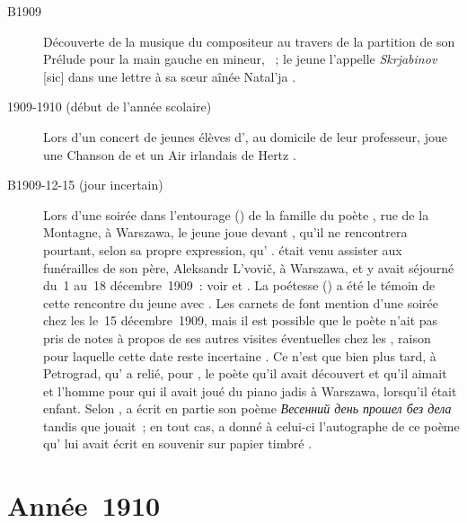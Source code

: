\begin{description}
 \item[B1909]
 Découverte de la musique du compositeur \AScriabine{} au travers de la
 partition de son Prélude pour la main gauche en \kC \Sharp mineur, 
 ~; le jeune \Sofronitsky{} l'appelle \emph{Skrjabinov} [sic] dans
 une lettre à sa sœur aînée Natal'ja \citep[voir][p.~55]{Juban}.
 \item[1909-1910 (début de l'année scolaire)]
 Lors d'un concert de jeunes élèves d'\ALebedevaGetsevich{}, au domicile de
 leur professeur, \VSofronitsky{} joue une Chanson de \Mendelssohn{} et un
 Air irlandais de Hertz \citep[voir][p.~136]{Nekrasova08}.
 \item[B1909-12-15 (jour incertain)]
 Lors d'une soirée dans l'entourage (\Gercog{}) de la famille du poète
 \ABlok{}, rue de la Montagne, à Warszawa, le jeune \Sofronitsky{} joue
 devant \Blok{}, qu'il ne rencontrera pourtant, selon sa propre expression,
 qu'
 \citep[voir][p.~392-393]{Voskobojnikov09a}.
 \Blok{} était venu assister aux funérailles de son père, Aleksandr L'vovič,
 à Warszawa, et y avait séjourné du~1 au~18 décembre~1909~: voir
 \citet[p.~432-433]{Milshteyn82a} et \citet[p.~136-139]{Nekrasova08}.
 La poétesse \EGercog{} () a été le témoin de cette
 rencontre du jeune \VSofronitsky{} avec \ABlok{}.
 Les carnets de \Blok{} font mention d'une soirée chez les \Gercog{} le~15
 décembre~1909, mais il est possible que le poète n'ait pas pris de notes à
 propos de ses autres visites éventuelles chez les \Gercog{}, raison pour
 laquelle cette date reste incertaine \citep[voir][p.~137]{Nekrasova08}.
 Ce n'est que bien plus tard, à Petrograd, qu'\EGercog{} a relié, pour
 \VSofronitsky{}, le poète qu'il avait découvert et qu'il aimait et l'homme
 pour qui il avait joué du piano jadis à Warszawa, lorsqu'il était enfant.
 Selon \citet[p.~14]{Evans08}, \ABlok{} a écrit en partie son poème
 \foreignlanguage{russian}{\emph{Весенний день прошел без дела}} tandis que
 \VSofronitsky{} jouait~; en tout cas, \EGercog{} a donné à celui-ci
 l'autographe de ce poème qu'\ABlok{} lui avait écrit en souvenir sur papier
 timbré \citep[voir][p.~137]{Nekrasova08}.
\end{description}

\section{Année~1910}


